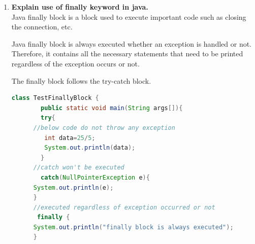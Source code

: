 \documentclass[11pt]{article}
\begin{document}
\begin{enumerate}
\begin{lstlisting}[language=C++]
	\end{lstlisting}
	\item \textbf{Explain use of finally keyword in java.}\\
	      Java finally block is a block used to execute important code such as closing the connection, etc.

	      Java finally block is always executed whether an exception is handled or not. Therefore, it contains all the necessary statements that need to be printed regardless of the exception occurs or not.

	      The finally block follows the try-catch block.

	      \begin{lstlisting}[language=Java]
	class TestFinallyBlock {    
		public static void main(String args[]){    
		try{    
	  //below code do not throw any exception  
		 int data=25/5;    
		 System.out.println(data);    
		}    
	  //catch won't be executed  
		catch(NullPointerException e){  
	  System.out.println(e);  
	  }    
	  //executed regardless of exception occurred or not  
	   finally {  
	  System.out.println("finally block is always executed");  
	  }    
\end{lstlisting}
\end{enumerate}
\end{document}

